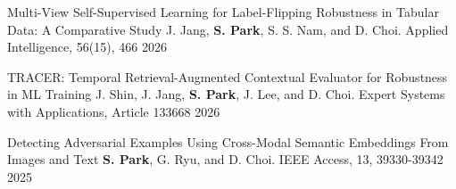\begin{cvhonors}
  \cvhonor
    {Multi-View Self-Supervised Learning for Label-Flipping Robustness in Tabular Data: A Comparative Study}
    {J. Jang, \textbf{S. Park}, S. S. Nam, and D. Choi. Applied Intelligence, 56(15), 466}
    {}
    {2026}

  \cvhonor
    {TRACER: Temporal Retrieval-Augmented Contextual Evaluator for Robustness in ML Training}
    {J. Shin, J. Jang, \textbf{S. Park}, J. Lee, and D. Choi. Expert Systems with Applications, Article 133668}
    {}
    {2026}

  \cvhonor
    {Detecting Adversarial Examples Using Cross-Modal Semantic Embeddings From Images and Text}
    {\textbf{S. Park}, G. Ryu, and D. Choi. IEEE Access, 13, 39330-39342}
    {}
    {2025}
\end{cvhonors}

\newpage
{}


